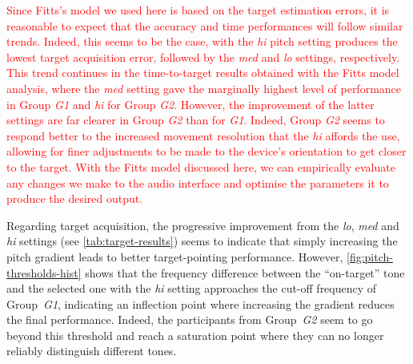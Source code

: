 \documentclass[acmsmall]{acmart}
\newcommand\hl[1]{\textcolor{red}{#1}}
\begin{document}
\hl{Since Fitts's model we used here is based on the target estimation errors, it is reasonable to expect that the accuracy and time performances will follow similar trends. 
Indeed, this seems to be the case, with the \textit{hi} pitch setting produces the lowest target acquisition error, followed by the \textit{med} and \textit{lo} settings, respectively. 
This trend continues in the time-to-target results obtained with the Fitts model analysis, where the \textit{med} setting gave the marginally highest level of performance in Group \textit{G1} and \textit{hi} for Group \textit{G2}.
However, the improvement of the latter settings are far clearer in Group \textit{G2} than for \textit{G1}.
Indeed, Group \textit{G2} seems to respond better to the increased movement resolution that the \textit{hi} affords the use, allowing for finer adjustments to be made to the device's orientation to get closer to the target.
With the Fitts model discussed here, we can empirically evaluate any changes we make to the audio interface and optimise the parameters it to produce the desired output. }

Regarding target acquisition, the progressive improvement from the \textit{lo}, \textit{med} and \textit{hi} settings (see \cref{tab:target-results}) seems to indicate that simply increasing the pitch gradient leads to better target-pointing performance.
However, \cref{fig:pitch-thresholds-hist} shows that the frequency difference between the ``on-target'' tone and the selected one with the \textit{hi} setting approaches the cut-off frequency of Group~\textit{G1}, indicating an inflection point where increasing the gradient reduces the final performance. 
Indeed, the participants from Group~\textit{G2} seem to go beyond this threshold and reach a saturation point where they can no longer reliably distinguish different tones.  
\end{document}
